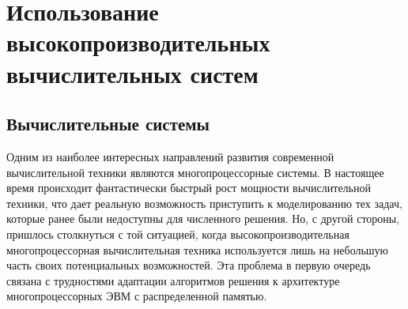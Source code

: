 \section{Использование высокопроизводительных вычислительных систем}

\subsection{Вычислительные системы}
Одним из наиболее интересных направлений развития современной вычислительной
техники являются многопроцессорные системы. В настоящее время происходит фантастически
быстрый рост мощности
вычислительной техники, что дает реальную возможность
приступить к моделированию тех задач, которые ранее были недоступны для
численного решения. Но, с другой стороны, пришлось столкнуться с той ситуацией,
когда высокопроизводительная многопроцессорная вычислительная техника используется 
лишь на небольшую часть своих потенциальных возможностей. Эта проблема в первую очередь 
связана с трудностями адаптации алгоритмов решения к архитектуре многопроцессорных 
ЭВМ с распределенной памятью. 
 
